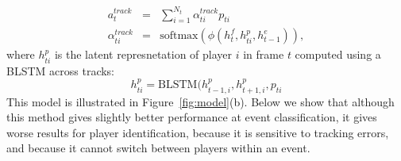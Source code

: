 \begin{eqnarray} 
\label{eq:track}
  a_t^{track} & = & \sum_{i=1}^{N_t} \alpha_{ti}^{track} p_{ti} 
\\ \nonumber
  \alpha_{ti}^{track} & = & \text{softmax} \left(\phi\left(h^f_t, h^p_{ti}, h^e_{t-1}\right)\right),
\end{eqnarray}
where $h_{ti}^p$ is the latent represnetation of player $i$ in frame
$t$ computed using a BLSTM across tracks:
\[
h_{ti}^p = \mbox{BLSTM}(h_{t-1,i}^p, h_{t+1,i}^p, p_{ti}
\]
This model is illustrated in Figure~\ref{fig:model}(b).
Below  we show that although this method gives slightly better
performance at event classification, it gives worse results for player
identification, because it is sensitive to tracking errors, and
because it cannot switch between players within an event.



